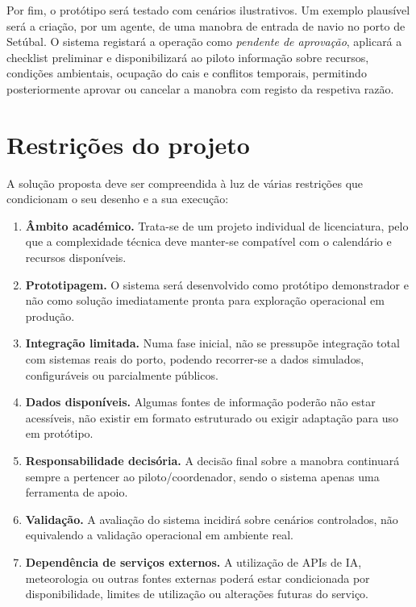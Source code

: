 \documentclass[a4paper,12pt]{report}
\begin{document}
Por fim, o protótipo será testado com cenários ilustrativos. Um exemplo plausível será a criação, por um agente, de uma manobra de entrada de navio no porto de Setúbal. O sistema registará a operação como \textit{pendente de aprovação}, aplicará a checklist preliminar e disponibilizará ao piloto informação sobre recursos, condições ambientais, ocupação do cais e conflitos temporais, permitindo posteriormente aprovar ou cancelar a manobra com registo da respetiva razão.

\section{Restrições do projeto}

A solução proposta deve ser compreendida à luz de várias restrições que condicionam o seu desenho e a sua execução:

\begin{enumerate}[label=\arabic*.]
    \item \textbf{Âmbito académico.} Trata-se de um projeto individual de licenciatura, pelo que a complexidade técnica deve manter-se compatível com o calendário e recursos disponíveis.
    \item \textbf{Prototipagem.} O sistema será desenvolvido como protótipo demonstrador e não como solução imediatamente pronta para exploração operacional em produção.
    \item \textbf{Integração limitada.} Numa fase inicial, não se pressupõe integração total com sistemas reais do porto, podendo recorrer-se a dados simulados, configuráveis ou parcialmente públicos.
    \item \textbf{Dados disponíveis.} Algumas fontes de informação poderão não estar acessíveis, não existir em formato estruturado ou exigir adaptação para uso em protótipo.
    \item \textbf{Responsabilidade decisória.} A decisão final sobre a manobra continuará sempre a pertencer ao piloto/coordenador, sendo o sistema apenas uma ferramenta de apoio.
    \item \textbf{Validação.} A avaliação do sistema incidirá sobre cenários controlados, não equivalendo a validação operacional em ambiente real.
    \item \textbf{Dependência de serviços externos.} A utilização de APIs de IA, meteorologia ou outras fontes externas poderá estar condicionada por disponibilidade, limites de utilização ou alterações futuras do serviço.
\end{enumerate}
\end{document}
